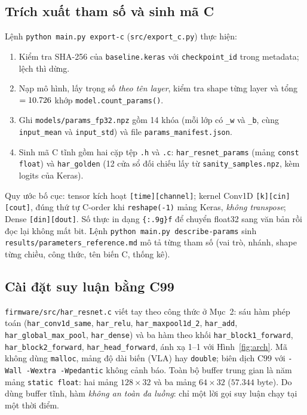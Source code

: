 \documentclass[12pt,a4paper]{article}
\newcommand{\code}[1]{\texttt{#1}}
\begin{document}
\subsection{Trích xuất tham số và sinh mã C}
Lệnh \code{python main.py export-c} (\code{src/export\_c.py}) thực hiện:
\begin{enumerate}
  \item Kiểm tra SHA-256 của \code{baseline.keras} với \code{checkpoint\_id} trong metadata; lệch thì dừng.
  \item Nạp mô hình, lấy trọng số \emph{theo tên layer}, kiểm tra shape từng layer và tổng $=\mbox{10.726}$ khớp \code{model.count\_params()}.
  \item Ghi \code{models/params\_fp32.npz} gồm 14 khóa (mỗi lớp có \code{\_w} và \code{\_b}, cùng \code{input\_mean} và \code{input\_std}) và file \code{params\_manifest.json}.
  \item Sinh mã C tĩnh gồm hai cặp tệp \code{.h} và \code{.c}: \code{har\_resnet\_params} (mảng \code{const float}) và \code{har\_golden} (12 cửa sổ đối chiếu lấy từ \code{sanity\_samples.npz}, kèm logits của Keras).
\end{enumerate}
Quy ước bố cục: tensor kích hoạt \code{[time][channel]}; kernel Conv1D \code{[k][cin][cout]}, đúng thứ tự C-order khi \code{reshape(-1)} mảng Keras, \emph{không transpose}; Dense \code{[din][dout]}. Số thực in dạng \code{\{:.9g\}f} để chuyển float32 sang văn bản rồi đọc lại không mất bit. Lệnh \code{python main.py describe-params} sinh \code{results/parameters\_reference.md} mô tả từng tham số (vai trò, nhánh, shape từng chiều, công thức, tên biến C, thống kê).

\subsection{Cài đặt suy luận bằng C99}
\code{firmware/src/har\_resnet.c} viết tay theo công thức ở Mục~2: sáu hàm phép toán (\code{har\_conv1d\_same}, \code{har\_relu}, \code{har\_maxpool1d\_2}, \code{har\_add}, \code{har\_global\_max\_pool}, \code{har\_dense}) và ba hàm theo khối \code{har\_block1\_forward}, \code{har\_block2\_forward}, \code{har\_head\_forward}, ánh xạ 1--1 với Hình~\ref{fig:arch}. Mã không dùng \code{malloc}, mảng độ dài biến (VLA) hay \code{double}; biên dịch C99 với \code{-Wall -Wextra -Wpedantic} không cảnh báo. Toàn bộ buffer trung gian là năm mảng \code{static float}: hai mảng $128\times32$ và ba mảng $64\times32$ ($57.344$ byte). Do dùng buffer tĩnh, hàm \emph{không an toàn đa luồng}: chỉ một lời gọi suy luận chạy tại một thời điểm.
\end{document}
